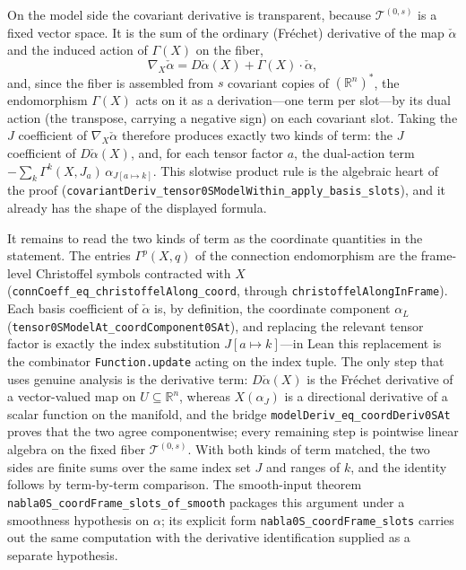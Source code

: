 \documentclass[11pt]{article}
\theoremstyle{plain}
\theoremstyle{definition}
\theoremstyle{remark}
\newcommand{\leanref}[1]{\nolinkurl{#1}}
\begin{document}
On the model side the covariant derivative is transparent, because
$\mathcal T^{(0,s)}$ is a fixed vector space.  It is the sum of the ordinary
(Fr\'echet) derivative of the map $\check \alpha$ and the induced action of
$\Gamma(X)$ on the fiber,
\[
  \nabla_X\check \alpha = D\check \alpha(X) + \Gamma(X)\cdot\check \alpha ,
\]
and, since the fiber is assembled from $s$ covariant copies of
$(\mathbb R^n)^*$, the endomorphism $\Gamma(X)$ acts on it as a
derivation---one term per slot---by its dual action (the transpose, carrying
a negative sign) on each covariant slot.
Taking the $J$ coefficient of $\nabla_X\check \alpha$ therefore produces
exactly two kinds of term: the $J$ coefficient of $D\check \alpha(X)$, and,
for each tensor factor $a$, the dual-action term
$-\sum_k\Gamma^k(X,J_a)\,\alpha_{J[a\mapsto k]}$.
This slotwise product rule is the algebraic heart of the proof
(\leanref{covariantDeriv_tensor0SModelWithin_apply_basis_slots}), and it already
has the shape of the displayed formula.

It remains to read the two kinds of term as the coordinate quantities in the
statement.  The entries $\Gamma^p(X,q)$ of the connection endomorphism are the
frame-level Christoffel symbols contracted with $X$
(\leanref{connCoeff_eq_christoffelAlong_coord}, through
\leanref{christoffelAlongInFrame}).  Each basis coefficient
of $\check \alpha$ is, by definition, the coordinate component $\alpha_L$
(\leanref{tensor0SModelAt_coordComponent0SAt}), and replacing the relevant
tensor factor is exactly the index substitution
$J[a\mapsto k]$---in Lean this replacement is the combinator
\texttt{Function.update} acting on the index tuple.  The only
step that uses genuine analysis is the derivative term:
$D\check \alpha(X)$ is the Fr\'echet derivative of a vector-valued map on
$U\subseteq\mathbb R^n$, whereas $X(\alpha_J)$ is a directional derivative of a
scalar function on the manifold, and the bridge
\leanref{modelDeriv_eq_coordDeriv0SAt} proves that the two agree componentwise;
every remaining step is pointwise linear algebra on the fixed fiber
$\mathcal T^{(0,s)}$.  With both kinds of term matched, the two sides are
finite sums over the same index set $J$ and ranges of $k$, and the
identity follows by term-by-term comparison.  The smooth-input theorem
\leanref{nabla0S_coordFrame_slots_of_smooth} packages this argument under a
smoothness hypothesis on $\alpha$; its explicit form
\leanref{nabla0S_coordFrame_slots} carries out the same computation with the
derivative identification supplied as a separate hypothesis.
\end{document}
